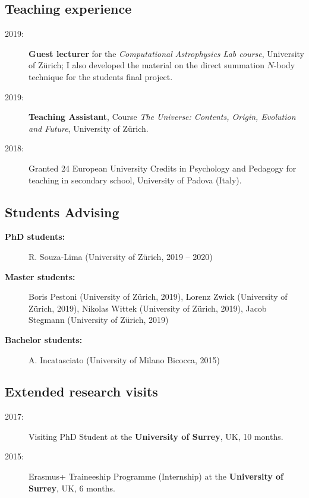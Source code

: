 \documentclass[11pt,a4paper]{article}
\begin{document}
\subsection*{Teaching experience}

\begin{description}
    \item[2019:] \textbf{Guest lecturer} for the   \textit{Computational Astrophysics Lab course}, University of Z\"urich; I also developed the material on the direct summation $N$-body technique for the students final project.

    \item[2019:] 
    \textbf{Teaching Assistant}, Course \textit{The Universe: Contents, Origin, Evolution and Future}, University of Z\"urich.

    \item[2018:] Granted 24 European University Credits in Psychology and Pedagogy for teaching in secondary school, University of Padova (Italy).
\end{description}

\subsection*{Students Advising}

\begin{description}

    
    \item[\bf PhD students:] R. Souza-Lima (University of Z\"urich, 2019 -- 2020)

    \item[\bf Master students:] Boris Pestoni (University of Z\"urich, 2019), Lorenz Zwick (University of Z\"urich, 2019), Nikolas Wittek (University of Z\"urich, 2019), Jacob Stegmann (University of Z\"urich, 2019)
    
    \item[\bf Bachelor students:]  A. Incatasciato (University of Milano Bicocca, 2015)


\end{description}

\subsection*{Extended research visits}
\begin{description}

    \item[2017:] {  Visiting PhD Student } at the {\bf University of Surrey}, UK, 10 months. 

    \item[2015:] { Erasmus+ Traineeship Programme} (Internship) at the {\bf University of Surrey}, UK, 6 months.  

\end{description}
\end{document}
